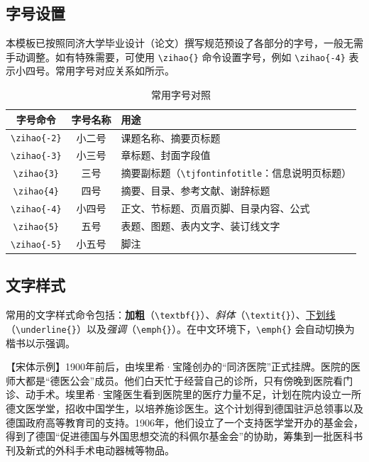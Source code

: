 \subsection{字号设置}

本模板已按照同济大学毕业设计（论文）撰写规范预设了各部分的字号，一般无需手动调整。如有特殊需要，可使用 \verb|\zihao{}| 命令设置字号，例如 \verb|\zihao{-4}| 表示小四号。常用字号对应关系如所示。

\begin{table}[htbp]
  \centering
  \caption{常用字号对照}\label{tab:font-sizes}
  \begin{tabular*}{\linewidth}{@{\extracolsep{\fill}}ccl}
    \toprule
    \textbf{字号命令} & \textbf{字号名称} & \textbf{用途} \\
    \midrule
    \texttt{\textbackslash zihao\{-2\}} & 小二号 & 课题名称、摘要页标题 \\
    \texttt{\textbackslash zihao\{-3\}} & 小三号 & 章标题、封面字段值 \\
    \texttt{\textbackslash zihao\{3\}}  & 三号   & 摘要副标题（\texttt{\textbackslash tjfontinfotitle}：信息说明页标题） \\
    \texttt{\textbackslash zihao\{4\}}  & 四号   & 摘要、目录、参考文献、谢辞标题 \\
    \texttt{\textbackslash zihao\{-4\}} & 小四号 & 正文、节标题、页眉页脚、目录内容、公式 \\
    \texttt{\textbackslash zihao\{5\}}  & 五号   & 表题、图题、表内文字、装订线文字 \\
    \texttt{\textbackslash zihao\{-5\}} & 小五号 & 脚注 \\
    \bottomrule
  \end{tabular*}
\end{table}

\subsection{文字样式}

常用的文字样式命令包括：\textbf{加粗}（\verb|\textbf{}|）、\textit{斜体}（\verb|\textit{}|）、\underline{下划线}（\verb|\underline{}|）以及\emph{强调}（\verb|\emph{}|）。在中文环境下，\verb|\emph{}| 会自动切换为楷书以示强调。

{\songti

【宋体示例】1900年前后，由埃里希·宝隆创办的“同济医院”正式挂牌。医院的医师大都是“德医公会”成员。他们白天忙于经营自己的诊所，只有傍晚到医院看门诊、动手术。埃里希·宝隆医生看到医院里的医疗力量不足，计划在院内设立一所德文医学堂，招收中国学生，以培养施诊医生。这个计划得到德国驻沪总领事以及德国政府高等教育司的支持。1906年，他们设立了一个支持医学堂开办的基金会，得到了德国“促进德国与外国思想交流的科佩尔基金会”的协助，筹集到一批医科书刊及新式的外科手术电动器械等物品。}

